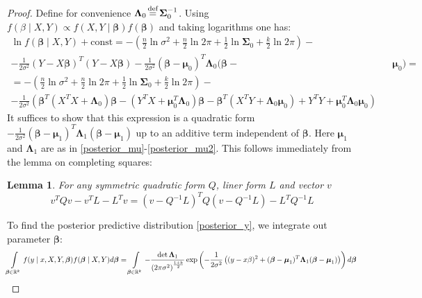 \documentclass[10pt,fleqn]{amsart}
\newtheorem{lemma}[theorem]{Lemma}
\theoremstyle{definition}
\theoremstyle{remark}
\numberwithin{equation}{section}
\newcommand{\RR}{\mathbb{R}}
\newcommand{\eq}{\stackrel{\mathclap{\normalfont\text{def}}}{=}}
\newcommand{\const}{\text{const}}
\newcommand{\bbeta}{\boldsymbol{\beta}}
\newcommand{\mmu}{\boldsymbol{\mu}}
\newcommand{\SSigma}{\boldsymbol{\Sigma}}
\newcommand{\LLambda}{\boldsymbol{\Lambda}}
\begin{document}
\begin{proof}
Define for convenience $\LLambda_0\eq\SSigma_0^{-1}$. Using $f(\beta\mid X, Y)\propto f(X, Y\mid \bbeta)f(\bbeta)$ and taking logarithms one has:
\begin{equation*}\begin{split}
    \ln f(\bbeta\mid X, Y)+\const=-\left(\frac n 2 \ln{\sigma^2}+\frac n 2\ln 2\pi+\frac 1 2 \ln \SSigma_0+\frac k 2 \ln 2\pi\right)-&&\\
    -\frac 1{2\sigma^2}(Y-X\bbeta)^T(Y-X\bbeta)-\frac 1{2\sigma^2}(\bbeta-\mmu_0)^T\LLambda_0(\bbeta -&&\mmu_0)=\\
    =-\left(\frac n 2\ln{\sigma^2}+\frac n 2\ln 2\pi+\frac 1 2 \ln \SSigma_0+\frac k 2 \ln 2\pi\right)-&&\\
    -\frac 1{2\sigma^2}\left(\bbeta^T\left(X^TX+\LLambda_0\right)\bbeta-(Y^TX+\mmu_0^T\LLambda_0)\bbeta-
    \bbeta^T\left(X^TY+\LLambda_0\mmu_0\right)+Y^TY+\mmu_0^T\LLambda_0\mmu_0\right)&&
\end{split}\end{equation*}
It suffices to show that this expression is a quadratic form $-\frac 1 {2\sigma^2}(\bbeta-\mmu_1)^T\LLambda_1(\bbeta-\mmu_1)$
up to an additive term independent of $\bbeta$. Here $\mmu_1$ and $\LLambda_1$ are as in \ref{posterior_mu}-\ref{posterior_mu2}.
This follows immediately from the lemma on completing squares:
\begin{lemma}\label{lemmaQ}
    For any symmetric quadratic form $Q$, liner form $L$ and vector $v$
    \begin{equation*}
        v^TQv-v^TL-L^Tv=(v-Q^{-1}L)^TQ(v-Q^{-1}L)-L^TQ^{-1}L
    \end{equation*}
\end{lemma}
To find the posterior predictive distribution \ref{posterior_y}, we integrate out parameter $\bbeta$:
\begin{equation*}
\int\displaylimits_{\bbeta\in\RR^k}f(y\mid x,X,Y,\bbeta)f(\bbeta\mid X,Y)d\bbeta=\int\displaylimits_{\bbeta\in\RR^k}
-\frac {\det \LLambda_1}{\left(2\pi\sigma^2\right)^{\frac{1+k}2}}\exp\left(-\frac 1{2\sigma^2}\left((y-x\beta)^2+(\bbeta-\mmu_1)^T\LLambda_1(\bbeta-\mmu_1)\right)\right)d\bbeta
\end{equation*}
\end{proof}
\end{document}

